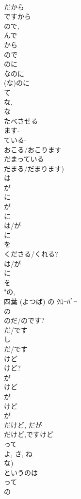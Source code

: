 \documentclass[8pt]{extreport}
\begin{document}
\begin{CJK}{UTF8}{min}
\\	だから 
\\	ですから	
\\	ので, 
\\	んで	
\\	から 
\\	ので 
\\	のに	
\\	なのに	
\\	(な)のに	
\\	て	
\\	な, 
\\	な 
\\	たべさせる 
\\	ます- 
\\	ている-
\\	おこる/おこります 
\\	だまっている 
\\	だまる/だまります)
\\	は 
\\	が	
\\	に	
\\	が	
\\	に	
\\	は/が 
\\	に 
\\	を	
\\	くださる/くれる?
\\	は/が 
\\	に 
\\	を	
\\	"の, 
\\	四葉 (よつば) の ｸﾛｰﾊﾞｰ
\\	の	
\\	のだ/のです?	
\\	だ/です
\\	し	
\\	だ/です
\\	けど		
\\	けど?
\\	が	
\\	けど 
\\	が 
\\	けど 
\\	が 
\\	だけど, だが 
\\	だけど,ですけど	
\\	って 
\\	よ, さ, ね 
\\	な)	
\\	というのは 
\\	って	
\\	の	

\end{CJK}
\end{document}

